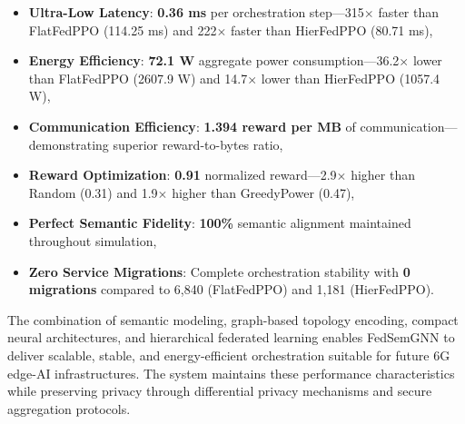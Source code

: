 \begin{itemize}
	\item \textbf{Ultra-Low Latency}: \textbf{0.36 ms} per orchestration step—315$\times$ faster than FlatFedPPO (114.25 ms) and 222$\times$ faster than HierFedPPO (80.71 ms),
	\item \textbf{Energy Efficiency}: \textbf{72.1 W} aggregate power consumption—36.2$\times$ lower than FlatFedPPO (2607.9 W) and 14.7$\times$ lower than HierFedPPO (1057.4 W),
	\item \textbf{Communication Efficiency}: \textbf{1.394 reward per MB} of communication—demonstrating superior reward-to-bytes ratio,
	\item \textbf{Reward Optimization}: \textbf{0.91} normalized reward—2.9$\times$ higher than Random (0.31) and 1.9$\times$ higher than GreedyPower (0.47),
	\item \textbf{Perfect Semantic Fidelity}: \textbf{100\%} semantic alignment maintained throughout simulation,
	\item \textbf{Zero Service Migrations}: Complete orchestration stability with \textbf{0 migrations} compared to 6,840 (FlatFedPPO) and 1,181 (HierFedPPO).
\end{itemize}

The combination of semantic modeling, graph-based topology encoding, compact neural architectures, and hierarchical federated learning enables FedSemGNN to deliver scalable, stable, and energy-efficient orchestration suitable for future 6G edge-AI infrastructures. The system maintains these performance characteristics while preserving privacy through differential privacy mechanisms and secure aggregation protocols.
